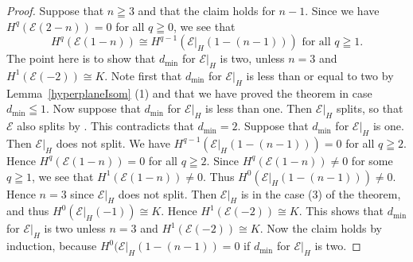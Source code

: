 \documentclass[a4paper,12pt]{amsart}
\begin{document}
\begin{proof}
Suppose that $n\geqq 3$ and that the claim 
holds
for $n-1$.
Since we have $H^q(\mathcal{E}(2-n))=0$ for all $q\geqq 0$, 
we see that 
\[H^q(\mathcal{E}(1-n))\cong H^{q-1}(\mathcal{E}|_H(1-(n-1))) \textrm{ for all }q\geqq 1.\]
The point here is to show that $d_{\min}$ for $\mathcal{E}|_H$ is two,
unless $n=3$ and $H^1(\mathcal{E}(-2))\cong K$.
Note first that $d_{\min}$ for $\mathcal{E}|_H$ is less than or equal to two
by Lemma~\ref{hyperplaneIsom} (1)
and that we have proved the theorem in case $d_{\min}\leqq 1$.
Now suppose that $d_{\min}$ for $\mathcal{E}|_H$ is less than one.
Then $\mathcal{E}|_H$ splits,
so that
$\mathcal{E}$ also splits by \cite[Chap. 1, Theorem 2.3.2]{oss}.
This contradicts that $d_{\min}=2$.
Suppose that $d_{\min}$ for $\mathcal{E}|_H$ is one.
Then 
$\mathcal{E}|_H$ does not split.
We have $H^{q-1}(\mathcal{E}|_H(1-(n-1)))=0$ for all $q\geqq 2$.
Hence $H^{q}(\mathcal{E}(1-n))=0$ for all $q\geqq 2$.
Since  $H^{q}(\mathcal{E}(1-n))\neq 0$ for some $q\geqq 1$,
we see that $H^1(\mathcal{E}(1-n))\neq 0$.
Thus $H^0(\mathcal{E}|_H(1-(n-1)))\neq 0$.
Hence $n=3$ since $\mathcal{E}|_H$ does not split.
Then $\mathcal{E}|_H$ is in the case (3) of the theorem,
and thus $H^0(\mathcal{E}|_H(-1))\cong K$.
Hence $H^1(\mathcal{E}(-2))\cong K$.
This shows that $d_{\min}$ for $\mathcal{E}|_H$ is two
unless $n=3$ and $H^1(\mathcal{E}(-2))\cong K$.
Now the claim holds by induction,
because $H^0(\mathcal{E}|_H(1-(n-1))=0$ if $d_{\min}$ for $\mathcal{E}|_H$ is two.


\end{proof}
\end{document}
